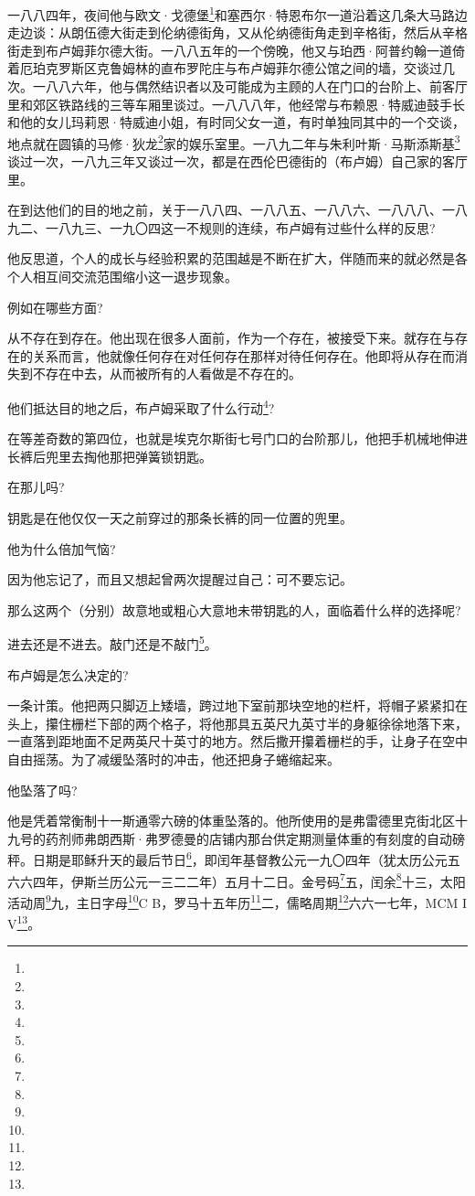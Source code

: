 \par 一八八四年，夜间他与欧文·戈德堡\footnote{}和塞西尔·特恩布尔一道沿着这几条大马路边走边谈：从朗伍德大街走到伦纳德街角，又从伦纳德街角走到辛格街，然后从辛格街走到布卢姆菲尔德大街。一八八五年的一个傍晚，他又与珀西·阿普约翰一道倚着厄珀克罗斯区克鲁姆林的直布罗陀庄与布卢姆菲尔德公馆之间的墙，交谈过几次。一八八六年，他与偶然结识者以及可能成为主顾的人在门口的台阶上、前客厅里和郊区铁路线的三等车厢里谈过。一八八八年，他经常与布赖恩·特威迪鼓手长和他的女儿玛莉恩·特威迪小姐，有时同父女一道，有时单独同其中的一个交谈，地点就在圆镇的马修·狄龙\footnote{}家的娱乐室里。一八九二年与朱利叶斯·马斯添斯基\footnote{}谈过一次，一八九三年又谈过一次，都是在西伦巴德街的（布卢姆）自己家的客厅里。
\par 在到达他们的目的地之前，关于一八八四、一八八五、一八八六、一八八八、一八九二、一八九三、一九〇四这一不规则的连续，布卢姆有过些什么样的反思?
\par 他反思道，个人的成长与经验积累的范围越是不断在扩大，伴随而来的就必然是各个人相互间交流范围缩小这一退步现象。
\par 例如在哪些方面?
\par 从不存在到存在。他出现在很多人面前，作为一个存在，被接受下来。就存在与存在的关系而言，他就像任何存在对任何存在那样对待任何存在。他即将从存在而消失到不存在中去，从而被所有的人看做是不存在的。
\par 他们抵达目的地之后，布卢姆采取了什么行动\footnote{}?
\par 在等差奇数的第四位，也就是埃克尔斯街七号门口的台阶那儿，他把手机械地伸进长裤后兜里去掏他那把弹簧锁钥匙。
\par 在那儿吗?
\par 钥匙是在他仅仅一天之前穿过的那条长裤的同一位置的兜里。
\par 他为什么倍加气恼?
\par 因为他忘记了，而且又想起曾两次提醒过自己：可不要忘记。
\par 那么这两个（分别）故意地或粗心大意地未带钥匙的人，面临着什么样的选择呢?
\par 进去还是不进去。敲门还是不敲门\footnote{}。
\par 布卢姆是怎么决定的?
\par 一条计策。他把两只脚迈上矮墙，跨过地下室前那块空地的栏杆，将帽子紧紧扣在头上，攥住栅栏下部的两个格子，将他那具五英尺九英寸半的身躯徐徐地落下来，一直落到距地面不足两英尺十英寸的地方。然后撒开攥着栅栏的手，让身子在空中自由摇荡。为了减缓坠落时的冲击，他还把身子蜷缩起来。
\par 他坠落了吗?
\par 他是凭着常衡制十一斯通零六磅的体重坠落的。他所使用的是弗雷德里克街北区十九号的药剂师弗朗西斯·弗罗德曼的店铺内那台供定期测量体重的有刻度的自动磅秤。日期是耶稣升天的最后节日\footnote{}，即闰年基督教公元一九〇四年（犹太历公元五六六四年，伊斯兰历公元一三二二年）五月十二日。金号码\footnote{}五，闰余\footnote{}十三，太阳活动周\footnote{}九，主日字母\footnote{}C B，罗马十五年历\footnote{}二，儒略周期\footnote{}六六一七年，MCM I V\footnote{}。
